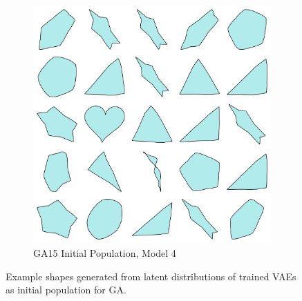 \documentclass{article}
\begin{document}
\begin{figure}[h]
\begin{subfigure}[b]{0.45\textwidth}
        \includegraphics[width=\textwidth]{figures/latent_gen_shapes/GA_15_50initial_pop.png}
        \caption{GA15 Initial Population, Model 4}
        \label{fig:latent_shape_popM4}
    \end{subfigure}
    \caption{Example shapes generated from latent distributions of trained VAEs as initial population for GA.}
    \label{fig:latent_sampled_shapes_GA}
\end{figure}
\end{document}
